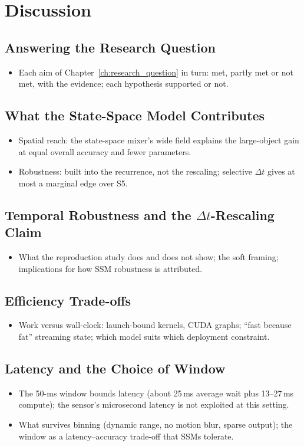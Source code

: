 \documentclass[11pt, a4paper]{report}
\newcommand{\Dt}{$\Delta t$}
\begin{document}
\chapter{Discussion}
\label{ch:discussion}
\section{Answering the Research Question}
\begin{itemize}
  \item Each aim of Chapter~\ref{ch:research_question} in turn: met, partly met or not met, with the evidence; each hypothesis supported or not.
\end{itemize}

\section{What the State-Space Model Contributes}
\label{sec:what_shown}
\begin{itemize}
  \item Spatial reach: the state-space mixer's wide field explains the large-object gain at equal overall accuracy and fewer parameters.
  \item Robustness: built into the recurrence, not the rescaling; selective \Dt{} gives at most a marginal edge over S5.
\end{itemize}

\section{Temporal Robustness and the \texorpdfstring{$\Delta t$}{Delta t}-Rescaling Claim}
\begin{itemize}
  \item What the reproduction study does and does not show; the soft framing; implications for how SSM robustness is attributed.
\end{itemize}

\section{Efficiency Trade-offs}
\begin{itemize}
  \item Work versus wall-clock: launch-bound kernels, CUDA graphs; ``fast because fat'' streaming state; which model suits which deployment constraint.
\end{itemize}

\section{Latency and the Choice of Window}
\begin{itemize}
  \item The 50-ms window bounds latency (about 25\,ms average wait plus 13--27\,ms compute); the sensor's microsecond latency is not exploited at this setting.
  \item What survives binning (dynamic range, no motion blur, sparse output); the window as a latency--accuracy trade-off that SSMs tolerate.
\end{itemize}
\end{document}
